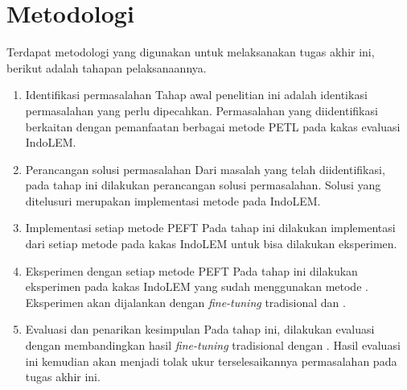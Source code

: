 \section{Metodologi}

Terdapat metodologi yang digunakan untuk melaksanakan tugas akhir ini, berikut adalah tahapan pelaksanaannya.

\begin{enumerate}
    \item Identifikasi permasalahan
    Tahap awal penelitian ini adalah identikasi permasalahan yang perlu dipecahkan. Permasalahan yang diidentifikasi berkaitan dengan pemanfaatan berbagai metode PETL pada kakas evaluasi IndoLEM.

    \item Perancangan solusi permasalahan
    Dari masalah yang telah diidentifikasi, pada tahap ini dilakukan perancangan solusi permasalahan. Solusi yang ditelusuri merupakan implementasi metode \PEFT pada IndoLEM.

    \item Implementasi setiap metode PEFT
    Pada tahap ini dilakukan implementasi dari setiap metode \PEFT pada kakas IndoLEM untuk bisa dilakukan eksperimen.

    \item Eksperimen dengan setiap metode PEFT
    Pada tahap ini dilakukan eksperimen pada kakas IndoLEM yang sudah menggunakan metode \PEFT. Eksperimen akan dijalankan dengan \textit{fine-tuning} tradisional dan \PEFT.

    \item Evaluasi dan penarikan kesimpulan
    Pada tahap ini, dilakukan evaluasi dengan membandingkan hasil \textit{fine-tuning} tradisional dengan \PEFT. Hasil evaluasi ini kemudian akan menjadi tolak ukur terselesaikannya permasalahan pada tugas akhir ini.

\end{enumerate}
